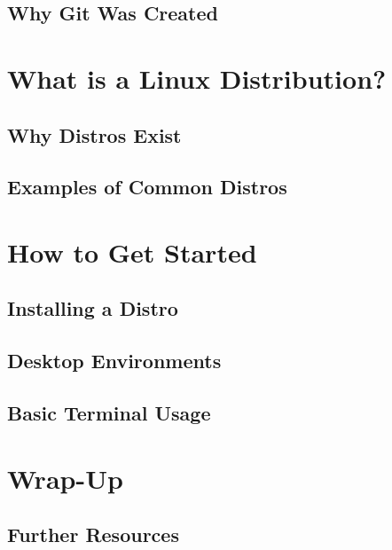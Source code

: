 	\subsection{Why Git Was Created}
	
	\section{What is a Linux Distribution?}
	\subsection{Why Distros Exist}
	\subsection{Examples of Common Distros}
	
	\section{How to Get Started}
	\subsection{Installing a Distro}
	\subsection{Desktop Environments}
	\subsection{Basic Terminal Usage}
	
	\section{Wrap-Up}
	\subsection{Further Resources}

